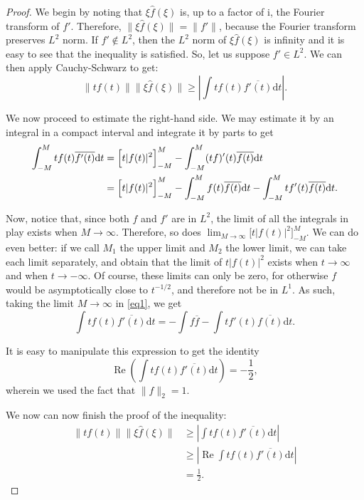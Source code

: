 \documentclass{amsart}
\newcommand{\dd}{\mathrm{d}}
\newcommand{\I}{\mathrm{i}}
\DeclareMathOperator{\re}{Re}
\begin{document}
\begin{proof}
We begin by noting that $\xi \hat f(\xi)$ is, up to a factor of $\I$, the Fourier transform of $f'$. Therefore, $\lVert \xi \hat f(\xi) \rVert = \lVert f' \rVert$, because the Fourier transform preserves $L^2$ norm. If $f' \not \in L^2$, then the $L^2$ norm of $\xi \hat f(\xi)$ is infinity and it is easy to see that the inequality is satisfied. So, let us suppose $f' \in L^2$. We can then apply Cauchy-Schwarz to get:
\begin{equation}\label{protoheisenberg}
\lVert t f(t) \rVert \lVert \xi \hat f(\xi) \rVert \geq \left\lvert \int t f(t) \overline{f'(t)} \dd t \right\rvert.
\end{equation}

We now proceed to estimate the right-hand side. We may estimate it by an integral in a compact interval and integrate it by parts to get
\begin{align}
\int_{-M}^M t f(t) \overline{f'(t)} \dd t &= \Bigl[t \lvert f(t) \rvert^2 \Bigr]_{-M}^M - \int_{-M}^M (t f)'(t) \overline{f(t)} \dd t\nonumber\\
&= \Bigl[t \lvert f(t) \rvert^2 \Bigr]_{-M}^M - \int_{-M}^M f(t) \overline{f(t)} \dd t - \int_{-M}^M t f'(t) \overline{f(t)} \dd t.\label{eq1}
\end{align}

Now, notice that, since both $f$ and $f'$ are in $L^2$, the limit of all the integrals in play exists when $M \to \infty$. Therefore, so does $\lim_{M \to \infty} \bigl[t \lvert f(t) \rvert^2 \bigr]_{-M}^M$. We can do even better: if we call $M_1$ the upper limit and $M_2$ the lower limit, we can take each limit separately, and obtain that the limit of $t \lvert f(t) \rvert^2$ exists when $t \to \infty$ and when $t \to -\infty$. Of course, these limits can only be zero, for otherwise $f$ would be asymptotically close to $t^{-1/2}$, and therefore not be in $L^1$. As such, taking the limit $M \to \infty$ in \eqref{eq1}, we get
\[\int t f(t) \overline{f'(t)} \dd t = - \int f \overline f - \int t f'(t) \overline{f(t)} \dd t.\]

It is easy to manipulate this expression to get the identity
\[\re\left( \int t f(t) \overline{f'(t)} \dd t \right) = -\frac12,\]
wherein we used the fact that $\lVert f \rVert_2 = 1$.

We now can now finish the proof of the inequality:
\begin{align*}
\lVert t f(t) \rVert \lVert \xi \hat f(\xi) \rVert &\geq \left\lvert \int t f(t) \overline{f'(t)} \dd t \right\rvert\\
&\geq \left\lvert \re \int t f(t) \overline{f'(t)} \dd t \right\rvert\\
&= \frac12.
\end{align*}


\end{proof}
\end{document}
